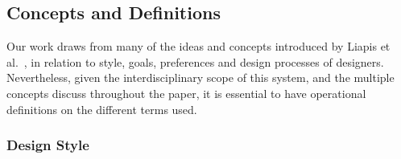 \subsection{Concepts and Definitions}



Our work draws from many of the ideas and concepts introduced by Liapis et al.~, in relation to style, goals, preferences and design processes of designers. Nevertheless, given the interdisciplinary scope of this system, and the multiple concepts discuss throughout the paper, it is essential to have operational definitions on the different terms used.

\subsubsection{Design Style} \label{p6sec:designStyle}




